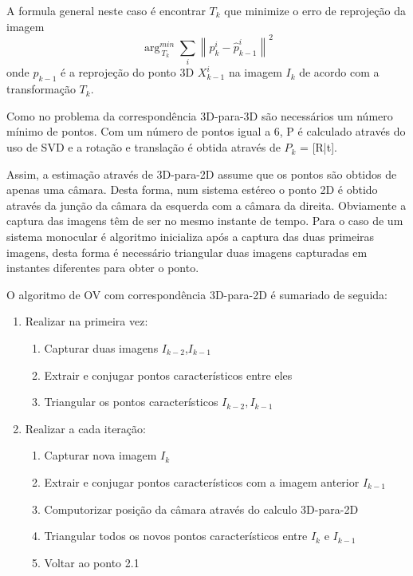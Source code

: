 A formula general neste caso é encontrar \textit{$T_k$} que minimize o erro de reprojeção da imagem \[ \arg_{\ T_k}^{min} \sum_{i}{\left \| p_k^i - \hat{p}_{k-1}^i \right \|}^2 \]
onde \textit{$p_{k-1}$} é a reprojeção do ponto 3D \textit{$X_{k-1}^i$} na imagem \textit{$I_k$} de acordo com a transformação \textit{$T_k$}. 

Como no problema da correspondência 3D-para-3D são necessários um número mínimo de pontos. Com um número de pontos igual a 6, P é calculado através do uso de SVD e a rotação e translação é obtida através de $P_k$ = [R|t]. 

Assim, a estimação através de 3D-para-2D assume que os pontos são obtidos de apenas uma câmara. Desta forma, num sistema estéreo o ponto 2D é obtido através da junção da câmara da esquerda com a câmara da direita. Obviamente a captura das imagens têm de ser no mesmo instante de tempo.  Para o caso de um sistema monocular é algoritmo inicializa após a captura das duas primeiras imagens, desta forma é necessário triangular duas imagens capturadas em instantes diferentes para obter o ponto.

O algoritmo de OV com correspondência 3D-para-2D é sumariado de seguida:
\begin{enumerate}
	\item Realizar na primeira vez:
	\begin{enumerate}[label*=\arabic*.]
		\item Capturar duas imagens \textit{$I_{k-2}$},\textit{$I_{k-1}$} 
		\item Extrair e conjugar pontos característicos entre eles
		\item Triangular os pontos característicos \textit{$I_{k-2},I_{k-1}$}
	\end{enumerate}
	\item Realizar a cada iteração:
	\begin{enumerate}[label*=\arabic*.]
		\item Capturar nova imagem \textit{$I_k$}
		\item Extrair e conjugar pontos característicos com a imagem anterior \textit{$I_{k-1}$}
		\item Computorizar posição da câmara através do calculo 3D-para-2D
		\item Triangular todos os novos pontos característicos entre \textit{$I_k$} e \textit{$I_{k-1}$}
		\item Voltar ao ponto 2.1
	\end{enumerate}
	
\end{enumerate}




